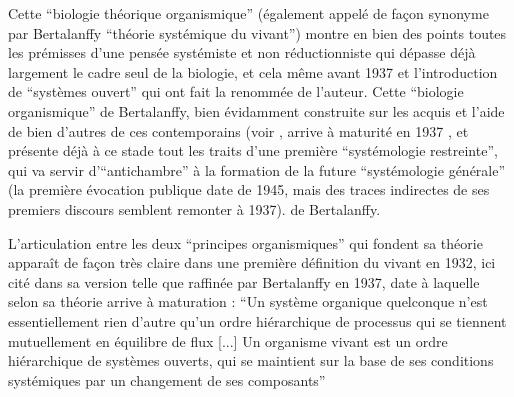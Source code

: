 Cette \enquote{biologie théorique organismique} (également appelé de façon synonyme par Bertalanffy \enquote{théorie systémique du vivant}) montre en bien des points toutes les prémisses d'une pensée systémiste et non réductionniste qui dépasse déjà largement le cadre seul de la biologie, et cela même avant 1937 et l'introduction de \enquote{systèmes ouvert} \autocite[499]{Pouvreau2013} qui ont fait la renommée de l'auteur.  Cette \enquote{biologie organismique} de Bertalanffy, bien évidamment construite sur les acquis et l'aide de bien d'autres de ces contemporains (voir \autocite{Pouvreau2013}, arrive à maturité en 1937 \autocite[14]{Pouvreau2013}, et présente déjà à ce stade tout les traits d'une première \enquote{systémologie restreinte}, qui va servir d'\enquote{antichambre} à la formation de la future \enquote{systémologie générale} (la première évocation publique date de 1945, mais des traces indirectes de ses premiers discours semblent remonter à 1937).\autocite[670]{Pouvreau2013} de Bertalanffy.


L'articulation entre les deux \enquote{principes organismiques} qui fondent sa théorie apparaît de façon très claire dans une première définition du vivant en 1932, ici cité dans sa version telle que raffinée par Bertalanffy en 1937, date à laquelle selon \autocite{Pouvreau2013} sa théorie arrive à maturation : \enquote{Un système organique quelconque n'est essentiellement rien d'autre qu'un ordre hiérarchique de processus qui se tiennent mutuellement en équilibre de flux [...] Un organisme vivant est un ordre hiérarchique de systèmes ouverts, qui se maintient sur la base de ses conditions systémiques par un changement de ses composants}


